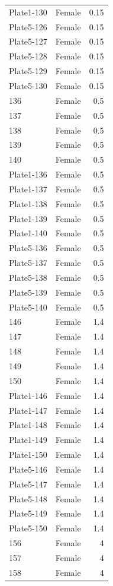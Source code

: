 \begin{longtable}{l l r}
Plate1-130 & Female & 0.15 \\
Plate5-126 & Female & 0.15 \\
Plate5-127 & Female & 0.15 \\
Plate5-128 & Female & 0.15 \\
Plate5-129 & Female & 0.15 \\
Plate5-130 & Female & 0.15 \\
136 & Female & 0.5 \\
137 & Female & 0.5 \\
138 & Female & 0.5 \\
139 & Female & 0.5 \\
140 & Female & 0.5 \\
Plate1-136 & Female & 0.5 \\
Plate1-137 & Female & 0.5 \\
Plate1-138 & Female & 0.5 \\
Plate1-139 & Female & 0.5 \\
Plate1-140 & Female & 0.5 \\
Plate5-136 & Female & 0.5 \\
Plate5-137 & Female & 0.5 \\
Plate5-138 & Female & 0.5 \\
Plate5-139 & Female & 0.5 \\
Plate5-140 & Female & 0.5 \\
146 & Female & 1.4 \\
147 & Female & 1.4 \\
148 & Female & 1.4 \\
149 & Female & 1.4 \\
150 & Female & 1.4 \\
Plate1-146 & Female & 1.4 \\
Plate1-147 & Female & 1.4 \\
Plate1-148 & Female & 1.4 \\
Plate1-149 & Female & 1.4 \\
Plate1-150 & Female & 1.4 \\
Plate5-146 & Female & 1.4 \\
Plate5-147 & Female & 1.4 \\
Plate5-148 & Female & 1.4 \\
Plate5-149 & Female & 1.4 \\
Plate5-150 & Female & 1.4 \\
156 & Female & 4 \\
157 & Female & 4 \\
158 & Female & 4 \\

\end{longtable}

